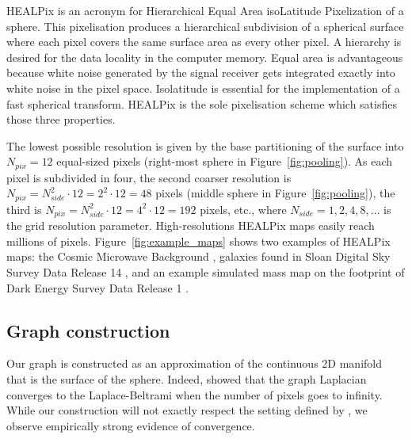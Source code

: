 \documentclass[final,twocolumn,3p,times,authoryear]{elsarticle}
\newcommand{\figref}[1]{Figure~\ref{fig:#1}}
\newcommand{\1}{\b{1}}              %
\newcommand{\0}{\b{0}}              %
\begin{document}
HEALPix is an acronym for Hierarchical Equal Area isoLatitude Pixelization of a sphere.
This pixelisation produces a hierarchical subdivision of a spherical surface where each pixel covers the same surface area as every other pixel.
A hierarchy is desired for the data locality in the computer memory.
Equal area is advantageous because white noise generated by the signal receiver gets integrated exactly into white noise in the pixel space.
Isolatitude is essential for the implementation of a fast spherical transform.
HEALPix is the sole pixelisation scheme which satisfies those three properties.

The lowest possible resolution is given by the base partitioning of the surface into $N_{pix} = 12$ equal-sized pixels (right-most sphere in \figref{pooling}).
As each pixel is subdivided in four, the second coarser resolution is $N_{pix} = N_{side}^2 \cdot 12 = 2^2 \cdot 12 = 48$ pixels (middle sphere in \figref{pooling}), the third is $N_{pix} = N_{side}^2 \cdot 12 = 4^2 \cdot 12 = 192$ pixels, etc., where $N_{side} = 1, 2, 4, 8, \ldots$ is the grid resolution parameter.
High-resolutions HEALPix maps easily reach millions of pixels.
\figref{example_maps} shows two examples of HEALPix maps: the Cosmic Microwave Background \citep{planck2015overview}, galaxies found in Sloan Digital Sky Survey Data Release 14 \citep{abolfathi2017sdssDR14}, and an example simulated mass map on the footprint of Dark Energy Survey Data Release 1 \citep{des2018dr1}.

\subsection{Graph construction}

Our graph is constructed as an approximation of the continuous 2D manifold that is the surface of the sphere.
Indeed, \citet{belkin2007convergence} showed that the graph Laplacian converges to the Laplace-Beltrami when the number of pixels goes to infinity.
While our construction will not exactly respect the setting defined by \citet{belkin2007convergence}, we observe empirically strong evidence of convergence.
\end{document}
